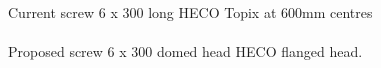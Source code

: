 \documentclass{article}
\begin{document}
Current screw 6 x 300 long HECO Topix at 600mm centres\\ \\
Proposed screw 6 x 300 domed head HECO flanged head.
\end{document}
